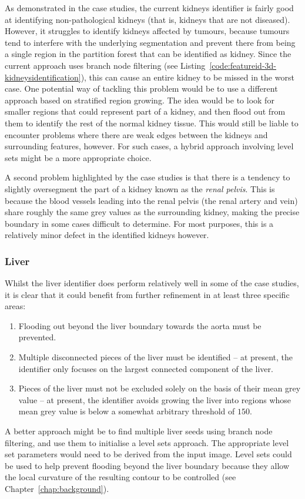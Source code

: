 As demonstrated in the case studies, the current kidneys identifier is fairly good at identifying non-pathological kidneys (that is, kidneys that are not diseased). However, it struggles to identify kidneys affected by tumours, because tumours tend to interfere with the underlying segmentation and prevent there from being a single region in the partition forest that can be identified as kidney. Since the current approach uses branch node filtering (see Listing~\ref{code:featureid-3d-kidneysidentification}), this can cause an entire kidney to be missed in the worst case. One potential way of tackling this problem would be to use a different approach based on stratified region growing. The idea would be to look for smaller regions that could represent part of a kidney, and then flood out from them to identify the rest of the normal kidney tissue. This would still be liable to encounter problems where there are weak edges between the kidneys and surrounding features, however. For such cases, a hybrid approach involving level sets might be a more appropriate choice.

A second problem highlighted by the case studies is that there is a tendency to slightly oversegment the part of a kidney known as the \emph{renal pelvis}. This is because the blood vessels leading into the renal pelvis (the renal artery and vein) share roughly the same grey values as the surrounding kidney, making the precise boundary in some cases difficult to determine. For most purposes, this is a relatively minor defect in the identified kidneys however.

\subsubsection{Liver}

Whilst the liver identifier does perform relatively well in some of the case studies, it is clear that it could benefit from further refinement in at least three specific areas:
%
\begin{enumerate}

\item Flooding out beyond the liver boundary towards the aorta must be prevented.
\item Multiple disconnected pieces of the liver must be identified -- at present, the identifier only focuses on the largest connected component of the liver.
\item Pieces of the liver must not be excluded solely on the basis of their mean grey value -- at present, the identifier avoids growing the liver into regions whose mean grey value is below a somewhat arbitrary threshold of $150$.

\end{enumerate}
%
A better approach might be to find multiple liver seeds using branch node filtering, and use them to initialise a level sets approach. The appropriate level set parameters would need to be derived from the input image. Level sets could be used to help prevent flooding beyond the liver boundary because they allow the local curvature of the resulting contour to be controlled (see Chapter~\ref{chap:background}).

